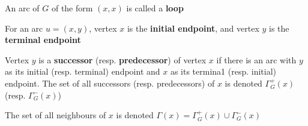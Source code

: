 \documentclass[aspectratio=43]{beamer}
\begin{document}
\begin{frame}
\begin{definition}[Loop]
An arc of $G$ of the form $(x,x)$ is called a \textbf{loop}
\end{definition}
\vfill
\begin{definition}
For an arc $u=(x,y)$, vertex $x$ is the \textbf{initial endpoint}, and vertex $y$ is the \textbf{terminal endpoint}
\end{definition}
\vfill
\begin{definition}
Vertex $y$ is a \textbf{successor} (resp. \textbf{predecessor}) of vertex $x$ if there is an arc with $y$ as its initial (resp. terminal) endpoint and $x$ as its termina1 (resp. initial) endpoint. The set of all successors (resp. predecessors) of $x$ is denoted $\Gamma^+_G(x)$ (resp. $\Gamma^-_G(x)$)
\end{definition}

\begin{definition}
The set of all neighbours of $x$ is denoted $\Gamma(x) = \Gamma^+_G(x)\cup\Gamma^-_G(x)$
\end{definition}
\end{frame}
\end{document}
